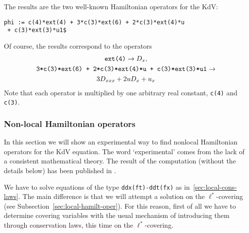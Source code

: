 The results are the two well-known Hamiltonian operators for the KdV:
\begin{verbatim}
phi := c(4)*ext(4) + 3*c(3)*ext(6) + 2*c(3)*ext(4)*u
 + c(3)*ext(3)*u1$
\end{verbatim}
Of course, the results correspond to the operators
\begin{gather*}
  \text{\texttt{ext(4)}} \to D_x,\\
  \text{\texttt{3*c(3)*ext(6) +
  2*c(3)*ext(4)*u + c(3)*ext(3)*u1}} \to \\
 3D_{xxx} + 2uD_{x} + u_x
\end{gather*}
Note that each operator is multiplied by one arbitrary real
constant, \texttt{c(4)} and \texttt{c(3)}.

\subsubsection{Non-local Hamiltonian operators}
\label{sec:non-local-hamilt}

In this section we will show an experimental way to find nonlocal Hamiltonian
operators for the KdV equation. The word `experimental' comes from the lack of
a consistent mathematical theory. The result of the computation (without the
details below) has been published in \cite{KKV}.

We have to solve equations of the type \texttt{ddx(ft)-ddt(fx)} as
in~\ref{sec:local-cons-laws}. The main difference is that we will attempt a
solution on the $\ell^*$-covering (see Subsection~\ref{sec:local-hamilt-oper}).
For this reason, first of all we have to determine covering variables with the
usual mechanism of introducing them through conservation laws, this time on the
$\ell^*$-covering.

